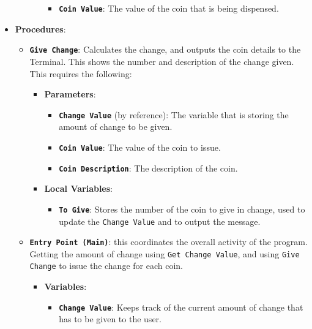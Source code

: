 \begin{itemize}
\begin{itemize}
\begin{itemize}
\begin{itemize}
        \item \texttt{\textbf{Coin Value}}: The value of the coin that is being dispensed.
      \end{itemize}
    \end{itemize}
  \end{itemize}
  \item \textbf{Procedures}:
  \begin{itemize}
    \item \texttt{\textbf{Give Change}}: Calculates the change, and outputs the coin details to the Terminal. This shows the number and description of the change given. This requires the following:
    \begin{itemize}
      \item \textbf{Parameters}:
      \begin{itemize}
        \item \textbf{\texttt{Change Value}} (by reference): The variable that is storing the amount of change to be given.
        \item \textbf{\texttt{Coin Value}}: The value of the coin to issue.
        \item \textbf{\texttt{Coin Description}}: The description of the coin.
      \end{itemize}
      \item \textbf{Local Variables}:
      \begin{itemize}
        \item \texttt{\textbf{To Give}}: Stores the number of the coin to give in change, used to update the \texttt{Change Value} and to output the message.
      \end{itemize}
    \end{itemize}
    \item \textbf{\texttt{Entry Point (Main)}}: this coordinates the overall activity of the program. Getting the amount of change using \texttt{Get Change Value}, and using \texttt{Give Change} to issue the change for each coin.
    \begin{itemize}
      \item \textbf{Variables}:
      \begin{itemize}
        \item \texttt{\textbf{Change Value}}: Keeps track of the current amount of change that has to be given to the user.
      \end{itemize}

    \end{itemize}
  \end{itemize}  
\end{itemize}

